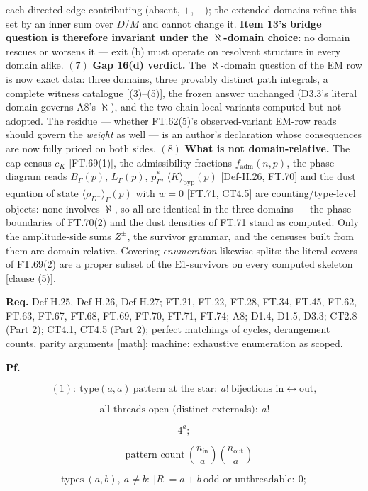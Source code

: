 \begin{theorem}
each directed edge contributing (absent, $+$, $-$); the extended domains refine this set by an inner sum over $D$/$M$ and cannot change it. \textbf{Item 13's bridge question is therefore invariant under the $\aleph$-domain choice}: no domain rescues or worsens it — exit (b) must operate on resolvent structure in every domain alike. $(7)$ \textbf{Gap 16(d) verdict.} The $\aleph$-domain question of the EM row is now exact data: three domains, three provably distinct path integrals, a complete witness catalogue [(3)–(5)], the frozen answer unchanged (D3.3's literal domain governs A8's $\aleph$), and the two chain-local variants computed but not adopted. The residue — whether FT.62(5)'s observed-variant EM-row reads should govern the \textit{weight} as well — is an author's declaration whose consequences are now fully priced on both sides. $(8)$ \textbf{What is not domain-relative.} The cap census $c_K$ [FT.69(1)], the admissibility fractions $f_{\mathrm{adm}}(n,p)$, the phase-diagram reads $B_\Gamma(p)$, $L_\Gamma(p)$, $p^*_\Gamma$, $\langle K\rangle_{\mathrm{byp}}(p)$ [Def-H.26, FT.70] and the dust equation of state $\langle\rho_{D^-}\rangle_\Gamma(p)$ with $w=0$ [FT.71, CT4.5] are counting/type-level objects: none involves $\aleph$, so all are identical in the three domains — the phase boundaries of FT.70(2) and the dust densities of FT.71 stand as computed. Only the amplitude-side sums $Z^{\pm}$, the survivor grammar, and the censuses built from them are domain-relative. Covering \textit{enumeration} likewise splits: the literal covers of FT.69(2) are a proper subset of the E1-survivors on every computed skeleton [clause (5)].

\textbf{Req.} Def-H.25, Def-H.26, Def-H.27; FT.21, FT.22, FT.28, FT.34, FT.45, FT.62, FT.63, FT.67, FT.68, FT.69, FT.70, FT.71, FT.74; A8; D1.4, D1.5, D3.3; CT2.8 (Part 2); CT4.1, CT4.5 (Part 2); perfect matchings of cycles, derangement counts, parity arguments [math]; machine: exhaustive enumeration as scoped.

\textbf{Pf.}

\[
(1):\ \text{type}(a,a)\ \text{pattern at the star}:\ a!\ \text{bijections in}\leftrightarrow\text{out},
\]

\[
\ \text{all threads open (distinct externals)}:\ a!\,
\]

\[
4^{a};
\]

\[
\quad\text{pattern count}\ \binom{n_{\mathrm{in}}}a\binom{n_{\mathrm{out}}}a
\]

\[
\text{types}\ (a,b),\ a\ne b:\ |R|=a+b\ \text{odd or unthreadable}:\ 0;
\]


\end{theorem}
